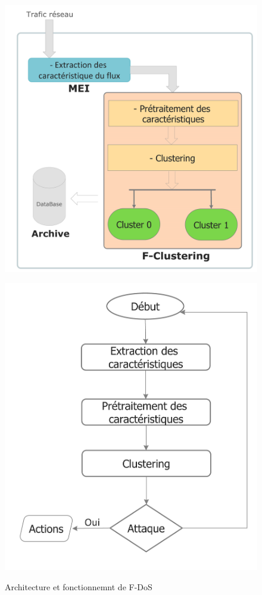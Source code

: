 \begin{figure}[h]
\centering
\begin{minipage}[b]{.52\textwidth}
\includegraphics[width=\textwidth]{Figures/F-DoS}
\label{fig:rDoS}
\end{minipage}
\begin{minipage}[b]{.45\textwidth}
\includegraphics[width=\textwidth]{Figures/Diagramme}
\label{fig:rDoS}
\end{minipage}
\decoRule
\caption{Architecture et fonctionnemnt de F-DoS}
\end{figure}

